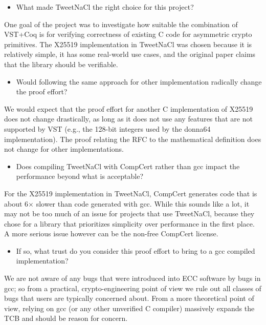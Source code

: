 \begin{center}
\end{center}

\begin{itemize}
  \item What made TweetNaCl the right choice for this project?
\end{itemize}

\begin{answer}
  One goal of the project was to investigate how suitable the combination of
  VST+Coq is for verifying correctness of existing C code for asymmetric
  crypto primitives. The X25519 implementation in TweetNaCl was chosen because
  it is relatively simple, it has some real-world use cases, and the original
  paper claims that the library should be verifiable.
\end{answer}

\begin{itemize}
  \item Would following the same approach for other implementation radically change the proof effort?
\end{itemize}

\begin{answer}
  We would expect that the proof effort for another C implementation of X25519
  does not change drastically, as long as it does not use any features that are
  not supported by VST (e.g., the 128-bit integers used by the donna64
  implementation). The proof relating the RFC to the mathematical definition
  does not change for other implementations.
\end{answer}

\begin{itemize}
  \item Does compiling TweetNaCl with CompCert rather than gcc impact the performance beyond what is acceptable?
\end{itemize}

\begin{answer}
  For the X25519 implementation in TweetNaCl, CompCert generates code that is
  about 6$\times$ slower than code generated with gcc. While this sounds like a lot, it
  may not be too much of an issue for projects that use TweetNaCl, because they
  chose for a library that prioritizes simplicity over performance in the first
  place. A more serious issue however can be the non-free CompCert license.
\end{answer}

\begin{itemize}
  \item If so, what trust do you consider this proof effort to bring to a gcc compiled implementation?
\end{itemize}

\begin{answer}
  We are not aware of any bugs that were introduced into ECC software by bugs in
  gcc; so from a practical, crypto-engineering point of view we rule out all
  classes of bugs that users are typically concerned about. From a more
  theoretical point of view, relying on gcc (or any other unverified C compiler)
  massively expands the TCB and should be reason for concern.
\end{answer}
